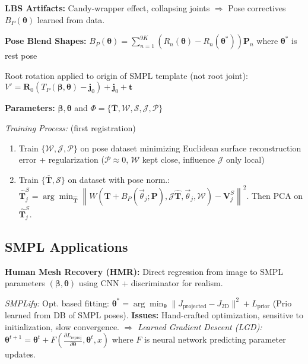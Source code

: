 \textbf{LBS Artifacts:} Candy-wrapper effect, collapsing joints $\Rightarrow$ Pose correctives $B_P(\boldsymbol{\theta})$ learned from data.

\textbf{Pose Blend Shapes:} $B_P(\boldsymbol{\theta}) = \sum_{n=1}^{9K}(R_n(\boldsymbol{\theta}) - R_n(\boldsymbol{\theta}^*)) \mathbf{P}_n$ where $\boldsymbol{\theta}^*$ is rest pose

Root rotation applied to origin of SMPL template (not root joint): $V' = \mathbf{R}_0(T_P(\boldsymbol{\beta}, \boldsymbol{\theta})- \mathbf{j}_0)+ \mathbf{j}_0 + \mathbf{t}$


\textbf{Parameters:} $\boldsymbol{\beta}, \boldsymbol{\theta}$ and $\Phi = \{\overline{\mathbf{T}}, \mathcal{W}, \mathcal{S}, \mathcal{J}, \mathcal{P}\}$

\emph{Training Process:} (first registration)
\begin{enumerate}
\item Train $\{\mathcal{W}, \mathcal{J}, \mathcal{P}\}$ on pose dataset minimizing Euclidean
surface reconstruction error + regularization ({\footnotesize $\mathcal{P} \approx 0$, $\mathcal{W}$ kept close, influence $\mathcal{J}$ only local})
\item Train $\{\overline{\mathbf{T}}, \mathcal{S}\}$ on dataset with pose norm.: {\scriptsize$\hat{\mathbf{T}}^{S}_{j} = \arg\min_{\hat{\mathbf{T}}} \left\| W\left( \mathbf{T} + B_P(\vec{\theta}_j; \mathbf{P}), \mathcal{J}\hat{\mathbf{T}}, \vec{\theta}_j, \mathcal{W} \right) - \mathbf{V}^{S}_{j} \right\|^2$. Then PCA on $\hat{\mathbf{T}}^{S}_{j}$.}
\end{enumerate}


\subsection{SMPL Applications}

\textbf{Human Mesh Recovery (HMR):} Direct regression from image to SMPL parameters $(\boldsymbol{\beta}, \boldsymbol{\theta})$ using CNN + discriminator for realism.

\emph{SMPLify:} Opt. based fitting:
{\footnotesize$\boldsymbol{\theta}^* = \arg\min_{\boldsymbol{\theta}} \|J_{\text{projected}} - J_{\text{2D}}\|^2 + L_{\text{prior}}$} (Prio learned from DB of SMPL poses).
\textbf{Issues:} Hand-crafted optimization, sensitive to initialization, slow convergence. $\Rightarrow$ \textit{Learned Gradient Descent (\emph{LGD}):}
{\footnotesize$\boldsymbol{\theta}^{t+1} = \boldsymbol{\theta}^t + F(\frac{\partial L_{\text{reproj}}}{\partial \boldsymbol{\theta}}, \boldsymbol{\theta}^t, x)$}
where $F$ is neural network predicting parameter updates.


